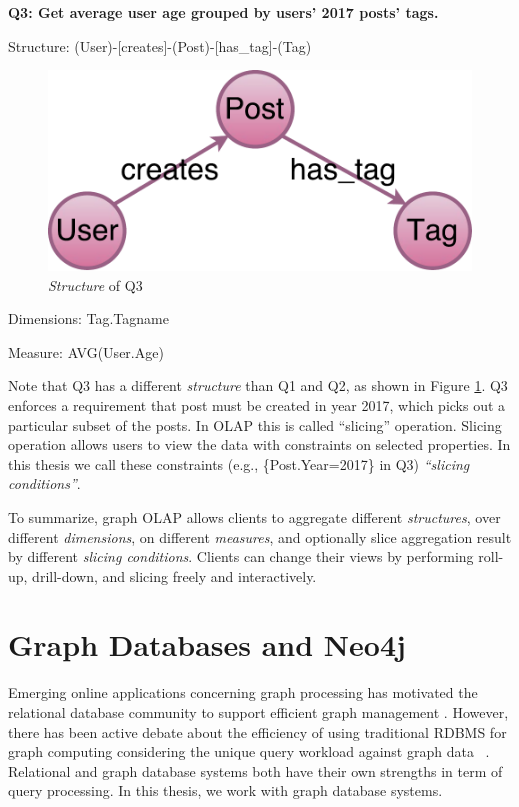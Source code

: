 \textbf{Q3: 		Get average user age grouped by users’ 2017 posts’ tags.}

Structure:	(User)-[creates]-(Post)-[has\_tag]-(Tag)
\begin{figure}[H]
	\centering
	\includegraphics[scale=0.35]{pic/meta2.pdf}
	\caption{\textit{Structure} of Q3}
	\label{fig:2:3}
\end{figure}


Dimensions:	{Tag.Tagname}

Measure:	{AVG(User.Age)}

Note that Q3 has a different \textit{structure} than Q1 and Q2, as shown in Figure \ref{fig:2:3}. Q3 enforces a requirement that post must be created in year 2017, which picks out a particular subset of  the posts. In OLAP this is called ``slicing'' operation. Slicing operation allows users to view the data with constraints on selected properties. In this thesis we call these constraints (e.g., \{Post.Year=2017\} in Q3) \textit{``slicing conditions''}.

To summarize, graph OLAP allows clients to aggregate different \textit{structures}, over different \textit{dimensions}, on different \textit{measures}, and optionally slice aggregation result by different \textit{slicing conditions}. Clients can change their views by performing roll-up, drill-down, and slicing freely and interactively.


\section{Graph Databases and Neo4j}
Emerging online applications concerning graph processing has motivated the relational database community to support efficient graph management \cite{DBLP:conf/grades/Xirogiannopoulos17} \cite{DBLP:conf/bigdataconf/JindalMCH15}. However, there has been active debate about the efficiency of using traditional RDBMS for graph computing considering the unique query workload against graph data~\cite{DBLP:conf/semweb/HernandezHRRZ16} \cite{DBLP:conf/edbt/HolschSG17}. Relational and graph database systems both have their own strengths in term of query processing. In this thesis, we work with graph database systems.

